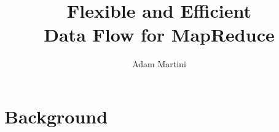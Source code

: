 \documentclass{beamer}
\title[Flexible and Efficient Data Flow for MapReduce]{Flexible and Efficient \\ Data Flow for MapReduce} %
\author{Adam Martini} %
\institute[UO] %
{
University of Oregon \\ %
\medskip
\textit{martini@cs.uoregon.edu} %
}
\date{\displaydate{date}} %
\begin{document}
\begin{frame}
\titlepage %
\end{frame}


%
%
%



\section{Background} %
\end{document}
